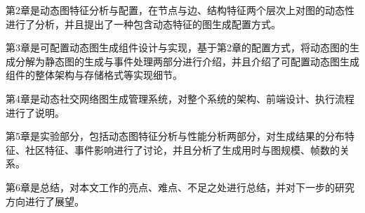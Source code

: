 第2章是动态图特征分析与配置，在节点与边、结构特征两个层次上对图的动态性进行了分析，并且提出了一种包含动态特征的图生成配置方式。

第3章是可配置动态图生成组件设计与实现，基于第2章的配置方式，将动态图的生成分解为静态图的生成与事件处理两部分进行介绍，并且介绍了可配置动态图生成组件的整体架构与存储格式等实现细节。

第4章是动态社交网络图生成管理系统，对整个系统的架构、前端设计、执行流程进行了说明。

第5章是实验部分，包括动态图特征分析与性能分析两部分，对生成结果的分布特征、社区特征、事件影响进行了讨论，并且分析了生成用时与图规模、帧数的关系。

第6章是总结，对本文工作的亮点、难点、不足之处进行总结，并对下一步的研究方向进行了展望。